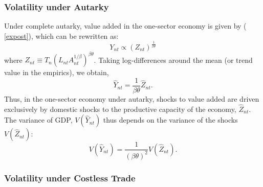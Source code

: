 \documentclass[12pt]{article}
\begin{document}
\subsubsection{Volatility under Autarky}

Under complete autarky, value added in the one-sector economy is given by (%
\ref{expost}), which can be rewritten as: 
\begin{equation*}
Y_{nt}\propto \left( Z_{nt}\right) ^{\frac{1}{\beta \theta }}
\end{equation*}
where $Z_{nt}\equiv T_{n}\left( L_{nt}A_{nt}^{1/\beta }\right)^{\beta\theta
} $. Taking log-differences around the mean (or trend value in the
empirics), we obtain, 
\begin{equation*}
\hat{Y}_{nt}=\frac{1}{\beta \theta }\hat{Z}_{nt}.
\end{equation*}
Thus, in the one-sector economy under autarky, shocks to value added are
driven exclusively by domestic shocks to the productive capacity of the
economy, $\hat{Z}_{nt}.$ The variance of GDP, $V(\hat{Y}_{nt})$ thus depends
on the variance of the shocks $V(\hat{Z}_{nt})$: 
\begin{equation*}
V(\hat{Y}_{nt})=\frac{1}{\left( \beta \theta \right) ^{2}}V(\hat{Z}_{nt}).
\end{equation*}

\subsubsection{Volatility under Costless Trade}
\end{document}

